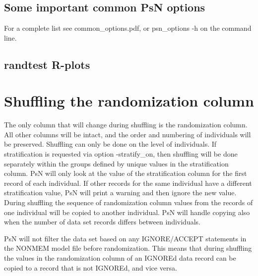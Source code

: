 \subsection{Some important common PsN options}
For a complete list see common\_options.pdf, or psn\_options -h on the  command line. 


\subsection{randtest R-plots}
\newcommand{\rplotsconditions}{See section Output, subsections Basic and Extended plots, for descriptions of the default randtest plots. The default randtest template requires that option -base\_model was used, that input (full) model has more THETAs than base (reduced) model, and that the additional THETAs are the ones relevant for the randomization column. For basic plots it is required that R libraries xpose4 and grid are installed. Extended plots also require that R libraries
ggplot2, reshape2, gridExtra, scales, MASS and plotrix are installed. If the conditions are not fulfilled then no pdf will be generated, see the .Rout file in the main run directory for error messages.}


\section{Shuffling the randomization column}

The only column that will change during shuffling is the randomization column. All other columns will be intact, and the order and numbering of individuals will be preserved. Shuffling can only be done on the level of individuals. If stratification is requested via option -stratify\_on, then shuffling will be done separately within the groups defined by unique values in the stratification column. PsN will only look at the value of the stratification column for the first record of each individual. If other records for the same individual have a different stratification value, PsN will print a warning and then ignore the new value.
During shuffling the sequence of randomization column values from the records of one individual will be copied to another individual. PsN will handle copying also when the number of data set records differs between individuals.

PsN will not filter the data set based on any IGNORE/ACCEPT statements in the NONMEM model file before randomization. This means that during shuffling the values in the randomization column of an IGNOREd data record can be copied to a record that is not IGNOREd, and vice versa.

